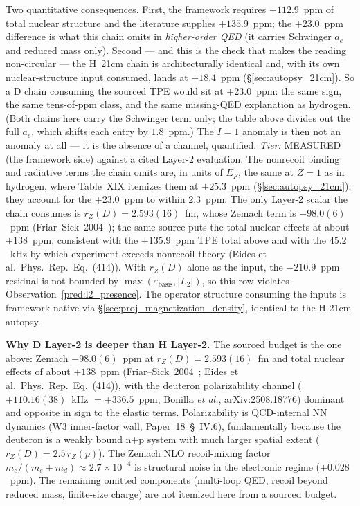 \documentclass[11pt]{article}
\begin{document}
Two quantitative consequences.  First, the framework requires
$+112.9$~ppm of total nuclear structure and the literature supplies
$+135.9$~ppm; the $+23.0$~ppm difference is what this chain omits in
\emph{higher-order QED} (it carries Schwinger $a_e$ and reduced mass
only).  Second --- and this is the check that makes the reading
non-circular --- the H~21cm chain is architecturally identical and,
with its own nuclear-structure input consumed, lands at $+18.4$~ppm
(\S\ref{sec:autopsy_21cm}).  So a D chain consuming the sourced TPE
would sit at $+23.0$~ppm: the same sign, the same tens-of-ppm class,
and the same missing-QED explanation as hydrogen.  (Both chains here
carry the Schwinger term only; the table above divides out the full
$a_e$, which shifts each entry by $1.8$~ppm.)  The $I=1$ anomaly
is then not an anomaly at all --- it is the absence of a channel,
quantified.  \emph{Tier:} MEASURED (the framework side) against a
cited Layer-2 evaluation.  The nonrecoil binding and radiative terms the
chain omits are, in units of $E_F$, the same at $Z = 1$ as in hydrogen,
where Table~XIX itemizes them at $+25.3$~ppm (\S\ref{sec:autopsy_21cm});
they account for the $+23.0$~ppm to within $2.3$~ppm.  The only
Layer-2 scalar the chain consumes is $r_Z(D) = 2.593(16)$~fm, whose
Zemach term is $-98.0(6)$~ppm (Friar--Sick~2004~\cite{friar_sick2004});
the same source puts the total nuclear effects at about $+138$~ppm,
consistent with the $+135.9$~ppm TPE total above and with the
$45.2$~kHz by which experiment exceeds nonrecoil theory (Eides et al.\
Phys.\ Rep.\ Eq.~(414)).  With $r_Z(D)$ alone as the input, the
$-210.9$~ppm residual is not bounded by
$\max(\varepsilon_\text{basis}, |L_2|)$, so this row violates
Observation~\ref{pred:l2_presence}.  The operator
structure consuming the inputs is framework-native via
\S\ref{sec:proj_magnetization_density}, identical to the H 21cm
autopsy.

\textbf{Why D Layer-2 is deeper than H Layer-2.}  The sourced budget is
the one above: Zemach $-98.0(6)$~ppm at $r_Z(D) = 2.593(16)$~fm and
total nuclear effects of about $+138$~ppm
(Friar--Sick~2004~\cite{friar_sick2004}; Eides et al.\ Phys.\ Rep.\
Eq.~(414)), with the deuteron polarizability channel ($+110.16(38)$~kHz
$= +336.5$~ppm, Bonilla \emph{et al.}, arXiv:2508.18776) dominant and
opposite in sign to the elastic terms.  Polarizability is
QCD-internal NN dynamics (W3 inner-factor wall, Paper~18~\S~IV.6),
fundamentally because the deuteron is a weakly bound n+p system
with much larger spatial extent ($r_Z(D) = 2.5\,r_Z(p)$).  The Zemach
NLO recoil-mixing factor $m_e/(m_e+m_d) \approx 2.7 \times 10^{-4}$
is structural noise in the electronic regime ($+0.028$~ppm).  The
remaining omitted components (multi-loop QED, recoil beyond reduced
mass, finite-size charge) are not itemized here from a sourced budget.
\end{document}
